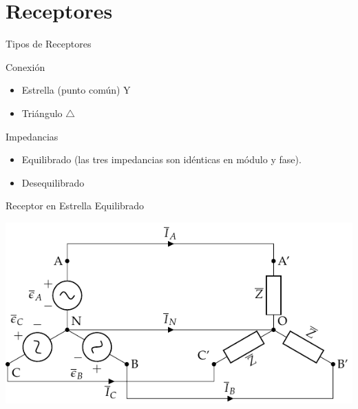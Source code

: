 \documentclass[aspectratio=169, usenames,svgnames,dvipsnames]{beamer}
\begin{document}
\section{Receptores}
\label{sec:org355f5d9}
\begin{frame}[label={sec:orga43121c}]{Tipos de Receptores}
\begin{block}{Conexión}
\begin{itemize}
\item \alert{Estrella} (punto común) Y
\item \alert{Triángulo} \(\triangle\)
\end{itemize}
\end{block}

\begin{block}{Impedancias}
\begin{itemize}
\item \alert{Equilibrado} (las tres impedancias son idénticas en módulo \alert{y} fase).
\item \alert{Desequilibrado}
\end{itemize}
\end{block}
\end{frame}


\begin{frame}[label={sec:orge47cf67}]{Receptor en Estrella Equilibrado}
\begin{center}
\includegraphics[width=.9\linewidth]{../figs/EstrellaEquilibrado.pdf}
\end{center}
\end{frame}
\end{document}
